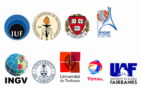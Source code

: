 \documentclass[oneside,english,onecolumn,letterpaper]{book}
\begin{document}
\begin{figure}[htbp]
\begin{center}
\includegraphics[width=0.125\textwidth]{figures/logo_IUF}
\includegraphics[width=0.135\textwidth]{figures/logo_Caltech}
\includegraphics[width=0.135\textwidth]{figures/logo_Harvard}
\includegraphics[width=0.135\textwidth]{figures/logo_IPGP}
\end{center}

\vspace*{2truemm}

\begin{center}
\includegraphics[width=0.119\textwidth]{figures/logo_INGV}
\includegraphics[width=0.119\textwidth]{figures/logo_University_of_Toronto}
\includegraphics[width=0.112\textwidth]{figures/logo_Univ_Toulouse}
\includegraphics[width=0.112\textwidth]{figures/logo_TOTAL}
\includegraphics[width=0.130\textwidth]{figures/logo_Fairbanks}
\end{center}
\end{figure}
\end{document}
